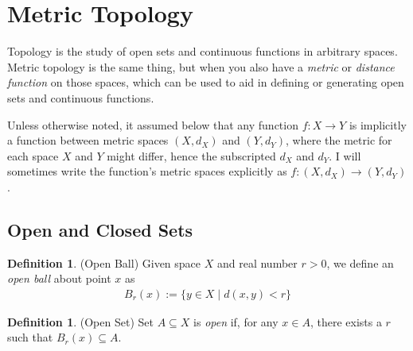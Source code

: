\documentclass[12pt]{article}
\numberwithin{equation}{section} %
\theoremstyle{plain}
\theoremstyle{definition}
\newtheorem{defn}[thm]{Definition}
\theoremstyle{remark}
\begin{document}
\clearpage
\section{Metric Topology}

Topology is the study of open sets and continuous functions in arbitrary
spaces. Metric topology is the same thing, but when you also have a
\emph{metric} or \emph{distance function} on those spaces, which can be
used to aid in defining or generating open sets and continuous
functions.

Unless otherwise noted, it assumed below that any function
$f:X\rightarrow Y$ is implicitly a function between metric spaces
$(X,d_X)$ and $(Y,d_Y)$, where the metric for each space $X$ and $Y$
might differ, hence the subscripted $d_X$ and $d_Y$.
I will sometimes write the function's metric spaces explicitly as
$f:(X,d_X)\rightarrow(Y,d_Y)$.

\subsection{Open and Closed Sets}

\begin{defn}{(Open Ball)}
Given space $X$ and real number $r>0$, we define an \emph{open ball}
about point $x$ as
\begin{align*}
  B_r(x) := \{ y \in X \;|\; d(x,y)<r\}
\end{align*}
\end{defn}

\begin{defn}{(Open Set)}
Set $A\subseteq X$ is \emph{open} if, for any $x\in A$, there exists a
$r$ such that $B_r(x)\subseteq A$.
\end{defn}
\end{document}
